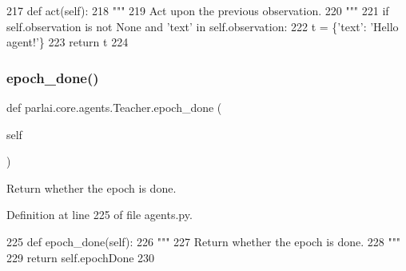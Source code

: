 \begin{DoxyCode}
217     \textcolor{keyword}{def }act(self):
218         \textcolor{stringliteral}{"""}
219 \textcolor{stringliteral}{        Act upon the previous observation.}
220 \textcolor{stringliteral}{        """}
221         \textcolor{keywordflow}{if} self.observation \textcolor{keywordflow}{is} \textcolor{keywordflow}{not} \textcolor{keywordtype}{None} \textcolor{keywordflow}{and} \textcolor{stringliteral}{'text'} \textcolor{keywordflow}{in} self.observation:
222             t = \{\textcolor{stringliteral}{'text'}: \textcolor{stringliteral}{'Hello agent!'}\}
223         \textcolor{keywordflow}{return} t
224 
\end{DoxyCode}
\mbox{\label{classparlai_1_1core_1_1agents_1_1Teacher_a4a2eda53b7b26f114ae3149b60f57845}} 
\subsubsection{\texorpdfstring{epoch\+\_\+done()}{epoch\_done()}}
{\footnotesize\ttfamily def parlai.\+core.\+agents.\+Teacher.\+epoch\+\_\+done (\begin{DoxyParamCaption}\item[{}]{self }\end{DoxyParamCaption})}

\begin{DoxyVerb}Return whether the epoch is done.
\end{DoxyVerb}
 

Definition at line 225 of file agents.\+py.


\begin{DoxyCode}
225     \textcolor{keyword}{def }epoch\_done(self):
226         \textcolor{stringliteral}{"""}
227 \textcolor{stringliteral}{        Return whether the epoch is done.}
228 \textcolor{stringliteral}{        """}
229         \textcolor{keywordflow}{return} self.epochDone
230 
\end{DoxyCode}
\mbox{\label{classparlai_1_1core_1_1agents_1_1Teacher_aa35e171610f8dd8e6a2fd5a87ad91e10}} 
